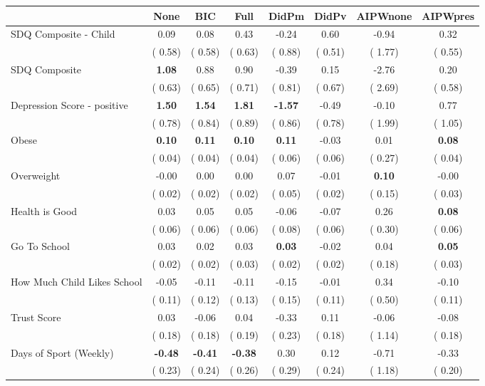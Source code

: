 \begin{tabular}{l c c c c c c c}
\toprule
 & None & BIC & Full & DidPm & DidPv & AIPWnone & AIPWpres \\
\midrule
SDQ Composite - Child &      0.09 &      0.08 &      0.43 &     -0.24 &      0.60 &     -0.94 &      0.32 \\
& (     0.58) & (     0.58) & (     0.63) & (     0.88) & (     0.51) & (     1.77) & (     0.55) \\
SDQ Composite & \textbf{      1.08 } &      0.88 &      0.90 &     -0.39 &      0.15 &     -2.76 &      0.20 \\
& (     0.63) & (     0.65) & (     0.71) & (     0.81) & (     0.67) & (     2.69) & (     0.58) \\
Depression Score - positive & \textbf{      1.50 } & \textbf{      1.54 } & \textbf{      1.81 } & \textbf{     -1.57 } &     -0.49 &     -0.10 &      0.77 \\
& (     0.78) & (     0.84) & (     0.89) & (     0.86) & (     0.78) & (     1.99) & (     1.05) \\
Obese & \textbf{      0.10 } & \textbf{      0.11 } & \textbf{      0.10 } & \textbf{      0.11 } &     -0.03 &      0.01 & \textbf{     0.08} \\
& (     0.04) & (     0.04) & (     0.04) & (     0.06) & (     0.06) & (     0.27) & (     0.04) \\
Overweight &     -0.00 &      0.00 &      0.00 &      0.07 &     -0.01 & \textbf{     0.10} &     -0.00 \\
& (     0.02) & (     0.02) & (     0.02) & (     0.05) & (     0.02) & (     0.15) & (     0.03) \\
Health is Good &      0.03 &      0.05 &      0.05 &     -0.06 &     -0.07 &      0.26 & \textbf{     0.08} \\
& (     0.06) & (     0.06) & (     0.06) & (     0.08) & (     0.06) & (     0.30) & (     0.06) \\
Go To School &      0.03 &      0.02 &      0.03 & \textbf{      0.03 } &     -0.02 &      0.04 & \textbf{     0.05} \\
& (     0.02) & (     0.02) & (     0.03) & (     0.02) & (     0.02) & (     0.18) & (     0.03) \\
How Much Child Likes School &     -0.05 &     -0.11 &     -0.11 &     -0.15 &     -0.01 &      0.34 &     -0.10 \\
& (     0.11) & (     0.12) & (     0.13) & (     0.15) & (     0.11) & (     0.50) & (     0.11) \\
Trust Score &      0.03 &     -0.06 &      0.04 &     -0.33 &      0.11 &     -0.06 &     -0.08 \\
& (     0.18) & (     0.18) & (     0.19) & (     0.23) & (     0.18) & (     1.14) & (     0.18) \\
Days of Sport (Weekly) & \textbf{     -0.48 } & \textbf{     -0.41 } & \textbf{     -0.38 } &      0.30 &      0.12 &     -0.71 &     -0.33 \\
& (     0.23) & (     0.24) & (     0.26) & (     0.29) & (     0.24) & (     1.18) & (     0.20) \\
\bottomrule
\end{tabular}
